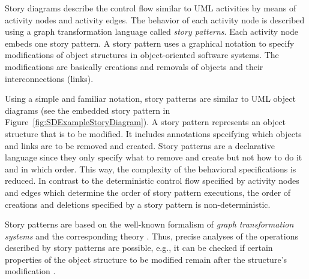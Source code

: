 Story diagrams describe the control flow similar to UML activities by means of activity nodes and activity edges.
The behavior of each activity node is described using a graph transformation language called \emph{story patterns}.
Each activity node embeds one story pattern.
A story pattern uses a graphical notation to specify modifications of object structures in object-oriented software systems.
The modifications are basically creations and removals of objects and their interconnections (links).


Using a simple and familiar notation, story patterns are similar to UML object diagrams (see the embedded story pattern in Figure~\ref{fig:SDExampleStoryDiagram}).
A story pattern represents an object structure that is to be modified.
It includes annotations specifying which objects and links are to be removed and created.
Story patterns are a declarative language since they only specify what to remove and create but not how to do it and in which order.
This way, the complexity of the behavioral specifications is reduced.
In contrast to the deterministic control flow specified by activity nodes and edges which determine the order of story pattern executions,
the order of creations and deletions specified by a story pattern is non-deterministic.


Story patterns are based on the well-known formalism of \emph{graph transformation systems} and the corresponding theory \cite{Roz97}.
Thus, precise analyses of the operations described by story patterns are possible,
e.g., it can be checked if certain properties of the object structure to be modified remain after the structure's modification \cite{Sch06,Mey09}.


